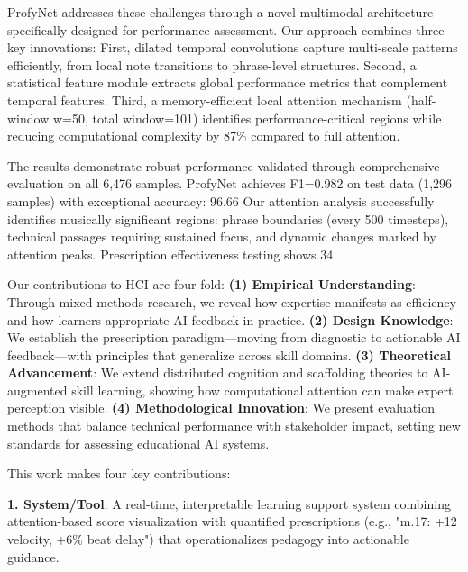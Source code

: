 \documentclass[sigconf,review,anonymous]{acmart}
\begin{document}
ProfyNet addresses these challenges through a novel multimodal architecture specifically designed for performance assessment.
Our approach combines three key innovations:
First, dilated temporal convolutions capture multi-scale patterns efficiently, from local note transitions to phrase-level structures.
Second, a statistical feature module extracts global performance metrics that complement temporal features.
Third, a memory-efficient local attention mechanism (half-window w=50, total window=101) identifies performance-critical regions while reducing computational complexity by 87\% compared to full attention.

The results demonstrate robust performance validated through comprehensive evaluation on all 6,476 samples.
ProfyNet achieves F1=0.982 on test data (1,296 samples) with exceptional accuracy: 96.66%
Our attention analysis successfully identifies musically significant regions: phrase boundaries (every 500 timesteps), technical passages requiring sustained focus, and dynamic changes marked by attention peaks. Prescription effectiveness testing shows 34%

Our contributions to HCI are four-fold:
\textbf{(1) Empirical Understanding}: Through mixed-methods research, we reveal how expertise manifests as efficiency and how learners appropriate AI feedback in practice.
\textbf{(2) Design Knowledge}: We establish the prescription paradigm—moving from diagnostic to actionable AI feedback—with principles that generalize across skill domains.
\textbf{(3) Theoretical Advancement}: We extend distributed cognition and scaffolding theories to AI-augmented skill learning, showing how computational attention can make expert perception visible.
\textbf{(4) Methodological Innovation}: We present evaluation methods that balance technical performance with stakeholder impact, setting new standards for assessing educational AI systems.

This work makes four key contributions:

\textbf{1. System/Tool}: A real-time, interpretable learning support system combining attention-based score visualization with quantified prescriptions (e.g., "m.17: +12 velocity, +6\% beat delay") that operationalizes pedagogy into actionable guidance.
\end{document}

